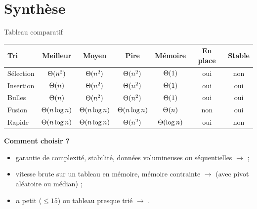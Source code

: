 \documentclass[11pt,aspectratio=169]{beamer}
\begin{document}
\section{Synthèse}

\begin{frame}{Tableau comparatif}
\begin{center}\scriptsize
\begin{tabular}{lcccccc}
\toprule
\textbf{Tri} & \textbf{Meilleur} & \textbf{Moyen} & \textbf{Pire} & \textbf{Mémoire} & \textbf{En place} & \textbf{Stable}\\
\midrule
Sélection & $\Theta(n^2)$ & $\Theta(n^2)$ & $\Theta(n^2)$ & $\Theta(1)$ & oui & non\\
Insertion & $\Theta(n)$ & $\Theta(n^2)$ & $\Theta(n^2)$ & $\Theta(1)$ & oui & oui\\
Bulles & $\Theta(n)$ & $\Theta(n^2)$ & $\Theta(n^2)$ & $\Theta(1)$ & oui & oui\\
\midrule
\rowcolor{tealclair}
Fusion & $\Theta(n\log n)$ & $\Theta(n\log n)$ & $\Theta(n\log n)$ & $\Theta(n)$ & non & oui\\
\rowcolor{tealclair}
Rapide & $\Theta(n\log n)$ & $\Theta(n\log n)$ & $\Theta(n^2)$ & $\Theta(\log n)$ & oui & non\\
\bottomrule
\end{tabular}
\end{center}
\vspace{6pt}
\begin{encadre}\small
\textbf{Comment choisir ?}
\begin{itemize}\setlength\itemsep{1pt}
  \item garantie de complexité, stabilité, données volumineuses ou séquentielles
        $\to$  ;
  \item vitesse brute sur un tableau en mémoire, mémoire contrainte
        $\to$  (avec pivot aléatoire ou médian) ;
  \item $n$ petit ($\le 15$) ou tableau presque trié $\to$ .
\end{itemize}
\end{encadre}
\end{frame}
\end{document}
